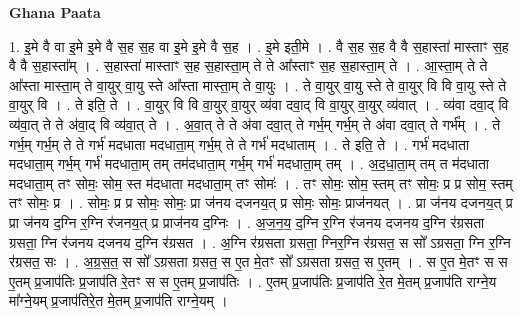 \documentclass[17pt]{extarticle}
\begin{document}
\textbf{Ghana Paata } \newline

1. इ॒मे वै वा इ॒मे इ॒मे वै स॒ह स॒ह वा इ॒मे इ॒मे वै स॒ह । . इ॒मे इती॒मे । . वै स॒ह स॒ह वै वै स॒हास्ता॑ मास्ताꣳ स॒ह वै वै स॒हास्ता᳚म् । . स॒हास्ता॑ मास्ताꣳ स॒ह स॒हास्ता॒म् ते ते आ᳚स्ताꣳ स॒ह स॒हास्ता॒म् ते । . आ॒स्ता॒म् ते ते आ᳚स्ता मास्ता॒म् ते वा॒युर् वा॒यु स्ते आ᳚स्ता मास्ता॒म् ते वा॒युः । . ते वा॒युर् वा॒यु स्ते ते वा॒युर् वि वि वा॒यु स्ते ते वा॒युर् वि । . ते इति॒ ते । . वा॒युर् वि वि वा॒युर् वा॒युर् व्य॑वा दवा॒द् वि वा॒युर् वा॒युर् व्य॑वात् । . व्य॑वा दवा॒द् वि व्य॑वा॒त् ते ते अ॑वा॒द् वि व्य॑वा॒त् ते । . अ॒वा॒त् ते ते अ॑वा दवा॒त् ते गर्भ॒म् गर्भ॒म् ते अ॑वा दवा॒त् ते गर्भ᳚म् । . ते गर्भ॒म् गर्भ॒म् ते ते गर्भ॑ मदधाता मदधाता॒म् गर्भ॒म् ते ते गर्भ॑ मदधाताम् । . ते इति॒ ते । . गर्भ॑ मदधाता मदधाता॒म् गर्भ॒म् गर्भ॑ मदधाता॒म् तम् तम॑दधाता॒म् गर्भ॒म् गर्भ॑ मदधाता॒म् तम् । . अ॒द॒धा॒ता॒म् तम् त म॑दधाता मदधाता॒म् तꣳ सोमः॒ सोम॒ स्त म॑दधाता मदधाता॒म् तꣳ सोमः॑ । . तꣳ सोमः॒ सोम॒ स्तम् तꣳ सोमः॒ प्र प्र सोम॒ स्तम् तꣳ सोमः॒ प्र । . सोमः॒ प्र प्र सोमः॒ सोमः॒ प्रा ज॑नय दजनय॒त् प्र सोमः॒ सोमः॒ प्राज॑नयत् । . प्रा ज॑नय दजनय॒त् प्र प्रा ज॑नय द॒ग्नि र॒ग्नि र॑जनय॒त् प्र प्राज॑नय द॒ग्निः । . अ॒ज॒न॒य॒ द॒ग्नि र॒ग्नि र॑जनय दजनय द॒ग्नि र॑ग्रसता ग्रसता॒ ग्नि र॑जनय दजनय द॒ग्नि र॑ग्रसत । . अ॒ग्नि र॑ग्रसता ग्रसता॒ ग्निर॒ग्नि र॑ग्रसत॒ स सो᳚ ऽग्रसता॒ ग्नि र॒ग्नि र॑ग्रसत॒ सः । . अ॒ग्र॒स॒त॒ स सो᳚ ऽग्रसता ग्रसत॒ स ए॒त मे॒तꣳ सो᳚ ऽग्रसता ग्रसत॒ स ए॒तम् । . स ए॒त मे॒तꣳ स स ए॒तम् प्र॒जाप॑तिः प्र॒जाप॑ति रे॒तꣳ स स ए॒तम् प्र॒जाप॑तिः । . ए॒तम् प्र॒जाप॑तिः प्र॒जाप॑ति रे॒त मे॒तम् प्र॒जाप॑ति राग्ने॒य मा᳚ग्ने॒यम् प्र॒जाप॑तिरे॒त मे॒तम् प्र॒जाप॑ति राग्ने॒यम् । \newline
\end{document}
